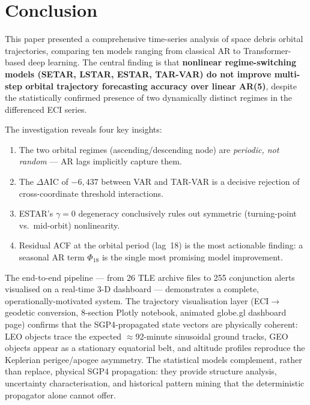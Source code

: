 \documentclass[conference]{IEEEtran}
\begin{document}
\section{Conclusion}
\label{sec:conclusion}

This paper presented a comprehensive time-series analysis of space debris
orbital trajectories, comparing ten models ranging from classical AR to
Transformer-based deep learning. The central finding is that \textbf{nonlinear
regime-switching models (SETAR, LSTAR, ESTAR, TAR-VAR) do not improve
multi-step orbital trajectory forecasting accuracy over linear AR(5)},
despite the statistically confirmed presence of two dynamically distinct
regimes in the differenced ECI series.

The investigation reveals four key insights:
\begin{enumerate}
  \item The two orbital regimes (ascending/descending node) are
        \emph{periodic, not random} --- AR lags implicitly capture them.
  \item The $\Delta$AIC of $-6{,}437$ between VAR and TAR-VAR is a
        decisive rejection of cross-coordinate threshold interactions.
  \item ESTAR's $\gamma=0$ degeneracy conclusively rules out symmetric
        (turning-point vs.\ mid-orbit) nonlinearity.
  \item Residual ACF at the orbital period (lag~18) is the most actionable
        finding: a seasonal AR term $\Phi_{18}$ is the single most
        promising model improvement.
\end{enumerate}

The end-to-end pipeline --- from 26 TLE archive files to 255 conjunction
alerts visualised on a real-time 3-D dashboard --- demonstrates a
complete, operationally-motivated system. The trajectory visualisation
layer (ECI$\to$geodetic conversion, 8-section Plotly notebook, animated
globe.gl dashboard page) confirms that the SGP4-propagated state vectors
are physically coherent: LEO objects trace the expected $\approx$92-minute
sinusoidal ground tracks, GEO objects appear as a stationary equatorial
belt, and altitude profiles reproduce the Keplerian perigee/apogee
asymmetry. The statistical models complement, rather than replace, physical
SGP4 propagation: they provide structure analysis, uncertainty
characterisation, and historical pattern mining that the deterministic
propagator alone cannot offer.
\end{document}

